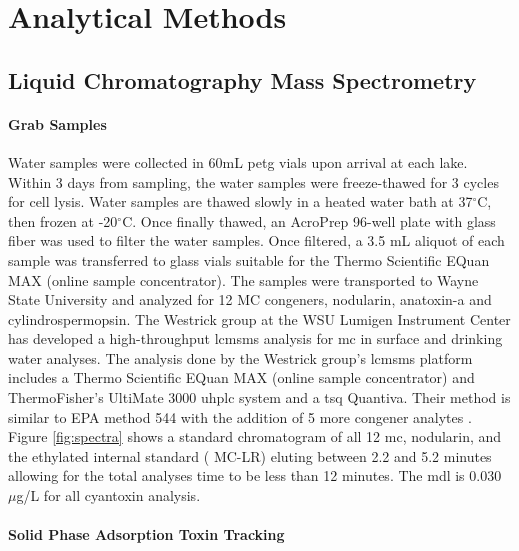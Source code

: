 \clearpage
\newpage

\section{Analytical Methods}

\subsection{Liquid Chromatography Mass Spectrometry} \label{sc:lcms}

\paragraph{Grab Samples}

Water samples were collected in 60mL \gls{petg} vials upon arrival at each lake. Within 3 days from sampling, the water samples were freeze-thawed for 3 cycles for cell lysis. Water samples are thawed slowly in a heated water bath at 37$^\circ$C, then frozen at -20$^\circ$C. Once finally thawed, an AcroPrep 96-well plate with glass fiber was used to filter the water samples. Once filtered, a 3.5 mL aliquot of each sample was transferred to glass vials suitable for the Thermo Scientific EQuan MAX (online sample concentrator). The samples were transported to Wayne State University and analyzed for 12 MC congeners, nodularin, anatoxin-a and cylindrospermopsin.  The Westrick group at the WSU Lumigen Instrument Center has developed a high-throughput \gls{lcmsms} analysis for \gls{mc} in surface and drinking water analyses.
The analysis done by the Westrick group's \gls{lcmsms} platform includes a Thermo Scientific EQuan MAX (online sample concentrator) and ThermoFisher’s UltiMate 3000 \gls{uhplc} system and a \gls{tsq} Quantiva.
Their method is similar to EPA method 544 with the addition of 5 more congener analytes \cite{shoemaker_method_2015}. Figure \ref{fig:spectra} shows a standard chromatogram of all 12 \gls{mc}, nodularin, and the ethylated internal standard (\ch{[C_2D_5]} MC-LR) eluting between 2.2 and 5.2 minutes allowing for the total analyses time to be less than 12 minutes.  The \gls{mdl} is 0.030  $\mu$g/L  for all cyantoxin analysis. 

\paragraph{Solid Phase Adsorption Toxin Tracking}

